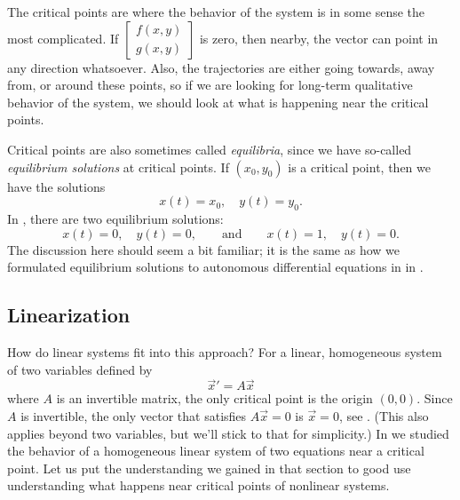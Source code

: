\documentclass{ximera}
\begin{document}
The critical points are where the behavior of the system is in some sense the most complicated.  If
$\left[ \begin{smallmatrix} f(x,y) \\ g(x,y) \end{smallmatrix} \right]$
is zero, then nearby, the vector can point in any direction whatsoever. Also, the trajectories are either going towards, away from, or around these points, so if we are looking for long-term qualitative behavior of the system, we should look at what is happening near the critical points.

Critical points are also sometimes called \emph{equilibria}, since we have so-called \emph{equilibrium solutions} at critical points. If $(x_0,y_0)$ is a critical point, then we have the solutions
\begin{equation*}
    x(t) = x_0, \quad y(t) = y_0 .
\end{equation*}
In , there are two equilibrium solutions:
\begin{equation*}
    x(t) = 0, \quad y(t) = 0, \qquad \text{and} \qquad x(t) = 1, \quad y(t) = 0.
\end{equation*}
The discussion here should seem a bit familiar; it is the same as how we formulated equilibrium solutions to autonomous differential equations in in .  

\subsection{Linearization}

How do linear systems fit into this approach? For a linear, homogeneous system of two variables defined by
\begin{equation*}
    \vec{x}' = A\vec{x}
\end{equation*}
where $A$ is an invertible matrix, the only critical point is the origin $(0,0)$. Since $A$ is invertible, the only vector that satisfies $A\vec{x} = 0$ is $\vec{x} = 0$, see . (This also applies beyond two variables, but we'll stick to that for simplicity.) In  we studied the behavior of a homogeneous linear system of two equations near a critical point. Let us put the understanding we gained in that section to good use understanding what happens near critical points of nonlinear systems.
\end{document}
